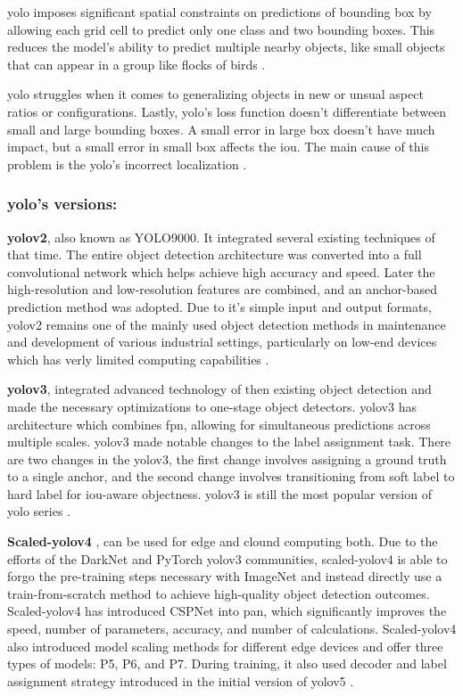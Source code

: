 \gls{yolo} imposes significant spatial constraints on predictions of bounding box by allowing each grid cell to predict only one class and two bounding boxes. This reduces the model's ability to predict multiple nearby objects, like small objects that can appear in a group like flocks of birds \cite{redmon2016you}.

\gls{yolo} struggles when it comes to generalizing objects in new or unsual aspect ratios or configurations. Lastly, \gls{yolo}'s loss function doesn't differentiate between small and large bounding boxes. A small error in large box doesn't have much impact, but a small error in small box affects the \gls{iou}. The main cause of this problem is the \gls{yolo}'s incorrect localization \cite{redmon2016you}.

\subsubsection*{\gls{yolo}'s versions: }

\textbf{\gls{yolo}v2}\cite{redmon2017yolo9000}, also known as YOLO9000. It integrated several existing techniques of that time. The entire object detection architecture was converted into a full convolutional network which helps achieve high accuracy and speed. Later the high-resolution and low-resolution features are combined, and an anchor-based prediction method was adopted. Due to it's simple input and output  formats, \gls{yolo}v2 remains one of the mainly used object detection methods in maintenance and development of various industrial settings, particularly on low-end devices which has verly limited computing capabilities \cite{wang2024yolov1}.

\textbf{\gls{yolo}v3}\cite{redmon2018yolov3}, integrated advanced technology of then existing object detection and made the necessary optimizations to one-stage object detectors. \gls{yolo}v3 has architecture which combines \gls{fpn}, allowing for simultaneous predictions across multiple scales. \gls{yolo}v3 made notable changes to the label assignment task. There are two changes in the \gls{yolo}v3, the first change involves assigning a ground truth to a single anchor, and the second change involves transitioning from soft label to hard label for \gls{iou}-aware objectness. \gls{yolo}v3 is still the most popular version of \gls{yolo} series \cite{wang2024yolov1}.

\textbf{Scaled-\gls{yolo}v4} \cite{wang2021scaled}, can be used for edge and clound computing both. Due to the efforts of the DarkNet and PyTorch \gls{yolo}v3 communities, scaled-\gls{yolo}v4 is able to forgo the pre-training steps necessary with ImageNet and instead directly use a train-from-scratch method to achieve high-quality object detection outcomes. Scaled-\gls{yolo}v4 has introduced CSPNet into \gls{pan}, which significantly improves the speed, number of parameters, accuracy, and number of calculations. Scaled-\gls{yolo}v4 also introduced model scaling methods for different edge devices and offer three types of models: P5, P6, and P7. During training, it also used decoder and label assignment strategy introduced in the initial version of \gls{yolo}v5 \cite{wang2024yolov1}.

